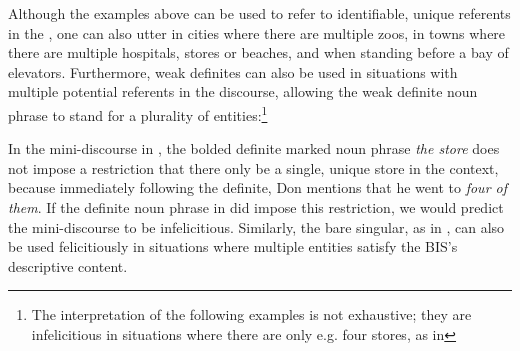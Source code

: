 \documentclass[output=paper,
modfonts
]{langscibook}
\begin{document}
Although the examples above can be used to refer to identifiable, unique referents in the , one can also utter  in cities where there are multiple zoos,  in towns where there are multiple hospitals, stores or beaches, and  when standing before a bay of elevators. Furthermore, weak definites can also be used in situations with multiple potential referents in the discourse, allowing the weak definite noun phrase to stand for a plurality of entities:\footnote{The interpretation of the following examples is not exhaustive; they are infelicitious in situations where there are only e.g. four stores, as in }

\begin{exe}
\end{exe}

In the mini-discourse in , the bolded definite marked noun phrase \textit{the store} does not impose a restriction that there only be a single, unique store in the context, because immediately following the definite, Don mentions that he went to \textit{four of them}. If the definite noun phrase in  did impose this restriction, we would predict the mini-discourse to be infelicitious. Similarly, the bare singular, as in , can also be used felicitiously in situations where multiple entities satisfy the BIS's descriptive content. 

\begin{exe}
\end{exe}
\end{document}
